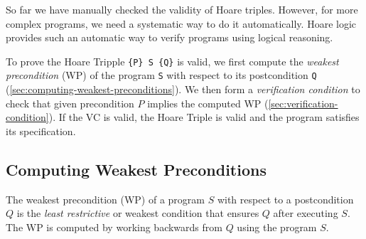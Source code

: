 \documentclass[oneside,11pt,dvipsnames]{book}
\renewcommand{\implies}{\Rightarrow}
\newcommand{\code}[1]{\texttt{#1}}
\begin{document}
So far we have manually checked the validity of Hoare triples. However, for more complex programs, we need a systematic way to do it automatically. Hoare logic provides such an automatic way to verify programs using logical reasoning.

To prove the Hoare Tripple \code{\{P\}\ \code{S} \{Q\}} is
valid, we first compute the \emph{weakest precondition} (WP) of the program \code{S} with respect to its postcondition \code{Q} (\autoref{sec:computing-weakest-preconditions}). We then form a \emph{verification condition} to check that given precondition $P$ implies the computed WP (\autoref{sec:verification-condition}). If the VC is valid, the Hoare Triple is valid and the program satisfies its specification.

\subsection{Computing Weakest Preconditions}\label{sec:computing-weakest-preconditions}

The weakest precondition (WP) of a program $S$ with respect to a postcondition $Q$ is the \emph{least restrictive} or weakest condition that ensures $Q$ after executing $S$. The WP is computed by working backwards from $Q$ using the program $S$. 

\end{document}
